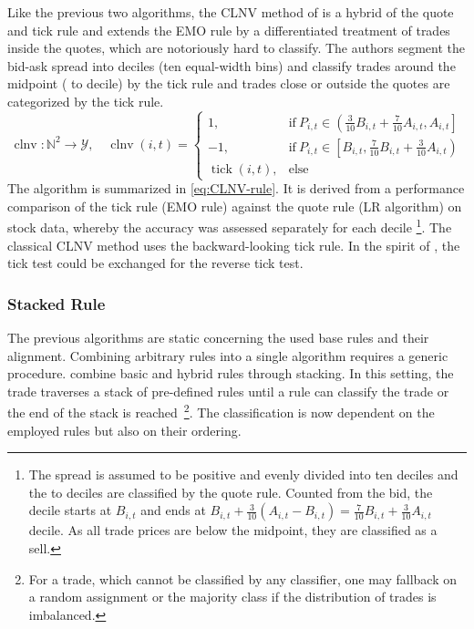 Like the previous two algorithms, the \gls{CLNV} method of \textcite[][3809]{chakrabartyTradeClassificationAlgorithms2012} is a hybrid of the quote and tick rule and extends the \gls{EMO} rule by a differentiated treatment of trades inside the quotes, which are notoriously hard to classify. The authors segment the bid-ask spread into deciles (ten equal-width bins) and classify trades around the midpoint ( to  decile) by the tick rule and trades close or outside the quotes are categorized by the tick rule.
\begin{equation}
    \operatorname{clnv} \colon \mathbb{N}^2 \to \mathcal{Y}, \quad
    \operatorname{clnv}(i, t)=
    \begin{cases}
        1,                         & \mathrm{if}\ P_{i, t} \in \left(\frac{3}{10} B_{i,t} + \frac{7}{10} A_{i,t}, A_{i, t}\right] \\
        -1,                        & \mathrm{if}\ P_{i, t} \in \left[ B_{i,t}, \frac{7}{10} B_{i,t} + \frac{3}{10} A_{i,t}\right) \\
        \operatorname{tick}(i, t), & \mathrm{else}
    \end{cases}
    \label{eq:CLNV-rule}
\end{equation}
The algorithm is summarized in \cref{eq:CLNV-rule}. It is derived from a performance comparison of the tick rule (\gls{EMO} rule) against the quote rule (\gls{LR} algorithm) on stock data, whereby the accuracy was assessed separately for each decile \footnote{The spread is assumed to be positive and evenly divided into ten deciles and the  to  deciles are classified by the quote rule. Counted from the bid, the  decile starts at $B_{i,t}$ and ends at $B_{i,t} + \tfrac{3}{10} (A_{i,t} - B_{i,t}) = \tfrac{7}{10} B_{i,t} + \tfrac{3}{10} A_{i,t}$  decile. As all trade prices are below the midpoint, they are classified as a sell.}. The classical \gls{CLNV} method uses the backward-looking tick rule. In the spirit of \textcite[][735]{leeInferringTradeDirection1991}, the tick test could be exchanged for the reverse tick test.

\subsubsection{Stacked Rule}\label{sec:stacked-rule}

The previous algorithms are static concerning the used base rules and their alignment. Combining arbitrary rules into a single algorithm requires a generic procedure. \textcite[][18]{grauerOptionTradeClassification2022} combine basic and hybrid rules through stacking. In this setting, the trade traverses a stack of pre-defined rules until a rule can classify the trade or the end of the stack is reached~\footnote{For a trade, which cannot be classified by any classifier, one may fallback on a random assignment or the majority class if the distribution of trades is imbalanced.}. The classification is now dependent on the employed rules but also on their ordering.

